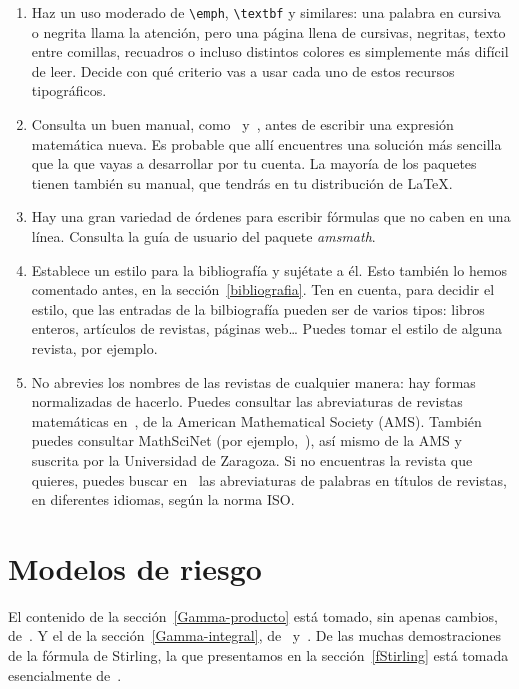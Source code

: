 \documentclass[11pt]{book}
\theoremstyle{plain} %
\theoremstyle{definition} %
\begin{document}
\begin{enumerate}
\item Haz un uso moderado de \verb"\emph", \verb"\textbf" y similares: una 
palabra en cursiva o negrita llama la atención, pero 
una página llena de cursivas, negritas, texto entre comillas, recuadros o incluso 
distintos colores es simplemente más difícil de leer. Decide con qué criterio vas 
a usar cada uno de estos recursos tipográficos.

\item Consulta un buen manual, como~\cite{CLMPS} y~\cite{MGBCR}, antes de escribir una expresión matemática nueva. Es probable que allí 
encuentres una solución más sencilla que la que vayas a desarrollar por tu 
cuenta. La mayoría de los paquetes tienen también su manual, que tendrás en tu 
distribución de {\LaTeX}.

\item Hay una gran variedad de órdenes para escribir fórmulas que no caben en una 
línea. Consulta la guía de 
usuario del paquete \emph{amsmath}.

\item Establece un estilo para la bibliografía y sujétate a 
él. Esto también lo hemos comentado antes, en la sección~\ref{bibliografia}. Ten 
en cuenta, para decidir el estilo, que las entradas de la bilbiografía pueden ser 
de varios tipos: libros enteros, artículos de revistas, páginas web{\dots} Puedes 
tomar el estilo de alguna revista, por ejemplo.

\item No abrevies los nombres de las revistas de cualquier manera: hay formas 
normalizadas de hacerlo. Puedes consultar las abreviaturas de revistas 
matemáticas en~\cite{A}, de la American 
Mathematical Society (AMS). También puedes consultar MathSciNet (por 
ejemplo,~\cite{A2}), así mismo de la AMS y suscrita por la Universidad de 
Zaragoza. Si no encuentras la revista que quieres, puedes buscar en~\cite{I} las 
abreviaturas de palabras en títulos de revistas, en diferentes idiomas, según la 
norma ISO.
\end{enumerate}

\section{Modelos de riesgo}

El contenido de la sección~\ref{Gamma-producto} está tomado, sin apenas cambios, 
de~\cite[pág.~518 y sig.]{BC}. Y el de la sección~\ref{Gamma-integral}, 
de~\cite[pág.~185--187]{C} y~\cite[pág.~206 y sig.]{W}. De las muchas 
demostraciones de la fórmula de Stirling, la que presentamos en la 
sección~\ref{fStirling} está tomada esencialmente de~\cite{P}.
\end{document}
